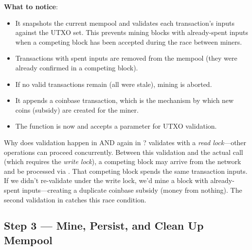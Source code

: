 \textbf{What to notice}:
\begin{itemize}
  \item It snapshots the current mempool and validates each transaction's inputs against the UTXO set. This prevents mining blocks with already-spent inputs when a competing block has been accepted during the race between miners.
  \item Transactions with spent inputs are removed from the mempool (they were already confirmed in a competing block).
  \item If no valid transactions remain (all were stale), mining is aborted.
  \item It appends a coinbase transaction, which is the mechanism by which new coins (subsidy) are created for the miner.
  \item The function is now  and accepts a  parameter for UTXO validation.
\end{itemize}

\begin{notebox}
Why does validation happen in  AND again in ?  validates with a \emph{read lock}---other operations can proceed concurrently. Between this validation and the actual  call (which requires the \emph{write lock}), a competing block may arrive from the network and be processed via . That competing block spends the same transaction inputs. If we didn't re-validate under the write lock, we'd mine a block with already-spent inputs---creating a duplicate coinbase subsidy (money from nothing). The second validation in  catches this race condition.
\end{notebox}

\subsection{Step 3 --- Mine, Persist, and Clean Up Mempool}
\label{sec:ch09-6-step3}

